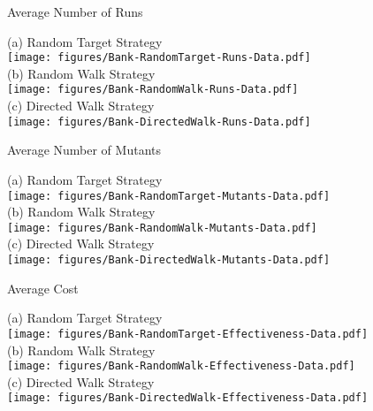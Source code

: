 \documentclass[preprint,1p,authoryear,times]{elsarticle}
\begin{document}
\begin{table}[htbp]
	\caption{Average Number of Runs}	\label{tab:BankRuns}
	\begin{center}
	\scriptsize{(a) Random Target Strategy}\\
	\texttt{[image: figures/Bank-RandomTarget-Runs-Data.pdf]}\\
	\scriptsize{(b) Random Walk Strategy}\\
	\texttt{[image: figures/Bank-RandomWalk-Runs-Data.pdf]}\\
		\scriptsize{(c) Directed Walk Strategy}\\
	\texttt{[image: figures/Bank-DirectedWalk-Runs-Data.pdf]}\\
	\end{center}
\end{table}

\begin{table}[htbp]
	\caption{Average Number of Mutants}	\label{tab:BankMutants}
	\begin{center}
	\scriptsize{(a) Random Target Strategy}\\
	\texttt{[image: figures/Bank-RandomTarget-Mutants-Data.pdf]}\\
	\scriptsize{(b) Random Walk Strategy}\\
	\texttt{[image: figures/Bank-RandomWalk-Mutants-Data.pdf]}\\
		\scriptsize{(c) Directed Walk Strategy}\\
	\texttt{[image: figures/Bank-DirectedWalk-Mutants-Data.pdf]}\\
	\end{center}
\end{table}

\begin{table}[htbp]
	\caption{Average Cost}	\label{tab:BankEffectiveness}
	\begin{center}
	\scriptsize{(a) Random Target Strategy}\\
	\texttt{[image: figures/Bank-RandomTarget-Effectiveness-Data.pdf]}\\
	\scriptsize{(b) Random Walk Strategy}\\
	\texttt{[image: figures/Bank-RandomWalk-Effectiveness-Data.pdf]}\\
		\scriptsize{(c) Directed Walk Strategy}\\
	\texttt{[image: figures/Bank-DirectedWalk-Effectiveness-Data.pdf]}\\
	\end{center}
\end{table}
\end{document}
